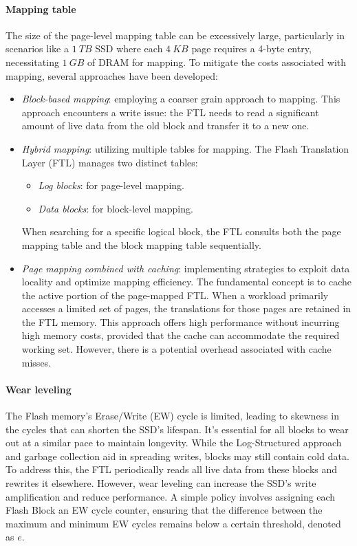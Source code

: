 \paragraph*{Mapping table}
The size of the page-level mapping table can be excessively large, particularly in scenarios like a $1\:TB$ SSD where each $4\:KB$ page requires a 4-byte entry, necessitating $1\:GB$ of DRAM for mapping. 
To mitigate the costs associated with mapping, several approaches have been developed:
\begin{itemize}
    \item \textit{Block-based mapping}: employing a coarser grain approach to mapping.
        This approach encounters a write issue: the FTL needs to read a significant amount of live data from the old block and transfer it to a new one.
    \item \textit{Hybrid mapping}: utilizing multiple tables for mapping.
        The Flash Translation Layer (FTL) manages two distinct tables:
        \begin{itemize}
            \item \textit{Log blocks}: for page-level mapping.
            \item \textit{Data blocks}: for block-level mapping.
        \end{itemize}
        When searching for a specific logical block, the FTL consults both the page mapping table and the block mapping table sequentially.
    \item \textit{Page mapping combined with caching}: implementing strategies to exploit data locality and optimize mapping efficiency.
        The fundamental concept is to cache the active portion of the page-mapped FTL.\@ 
        When a workload primarily accesses a limited set of pages, the translations for those pages are retained in the FTL memory. 
        This approach offers high performance without incurring high memory costs, provided that the cache can accommodate the required working set. 
        However, there is a potential overhead associated with cache misses.
\end{itemize}

\paragraph*{Wear leveling}
The Flash memory's Erase/Write (EW) cycle is limited, leading to skewness in the cycles that can shorten the SSD's lifespan. 
It's essential for all blocks to wear out at a similar pace to maintain longevity.
While the Log-Structured approach and garbage collection aid in spreading writes, blocks may still contain cold data. 
To address this, the FTL periodically reads all live data from these blocks and rewrites it elsewhere. 
However, wear leveling can increase the SSD's write amplification and reduce performance. 
A simple policy involves assigning each Flash Block an EW cycle counter, ensuring that the difference between the maximum and minimum EW cycles remains below a certain threshold, denoted as $e$.

